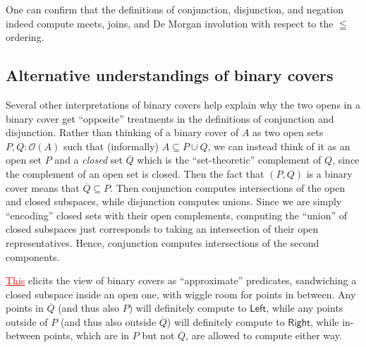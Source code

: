 \documentclass[conference]{IEEEtran}
\newcommand{\Open}[1]{\mathcal{O}({#1})}
\newcommand{\grammar}[1]{\textcolor{red}{\underline{#1}}}
\begin{document}
One can confirm that the definitions of conjunction, disjunction, and negation indeed compute meets, joins, and De Morgan involution with respect to the $\leqq$ ordering.

\subsection{Alternative understandings of binary covers}

Several other interpretations of binary covers help explain why the two opens in a binary cover get ``opposite'' treatments in the definitions of conjunction and disjunction. Rather than thinking of a binary cover of $A$ as two open sets $P, Q : \Open{A}$ such that (informally) $A \subseteq P \cup Q$, we can instead think of it as an open set $P$ and a \emph{closed} set $\overline{Q}$ which is the ``set-theoretic'' complement of $Q$, since the complement of an open set is closed. Then the fact that $(P, Q)$ is a binary cover means that $\overline{Q} \subseteq P$. Then conjunction computes intersections of the open and closed subspaces, while disjunction computes unions.
Since we are simply ``encoding'' closed sets with their open complements, computing the ``union'' of closed subspaces just corresponds to taking an intersection of their open representatives. Hence, conjunction computes intersections of the second components.

\grammar{This} elicits the view of binary covers as ``approximate'' predicates, sandwiching a closed subspace inside an open one, with wiggle room for points in between. Any points in $\overline{Q}$ (and thus also $P$) will definitely compute to $\mathsf{Left}$, while any points outside of $P$ (and thus also outside $\overline{Q}$) will definitely compute to $\mathsf{Right}$, while in-between points, which are in $P$ but not $\overline{Q}$, are allowed to compute either way.
\end{document}
